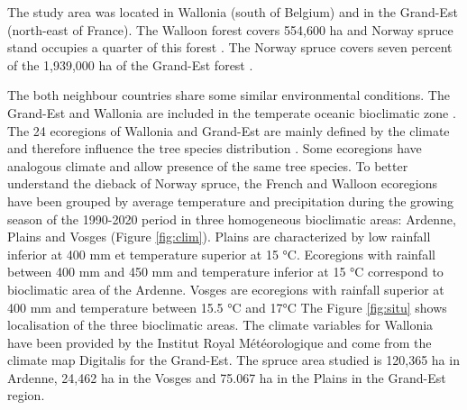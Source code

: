 \documentclass[3p,procedia]{elsarticle}
\begin{document}
The study area was located in Wallonia (south of Belgium) and in the Grand-Est (north-east of France).
The Walloon forest covers 554,600 ha and  Norway spruce stand occupies a quarter of this forest \citep{Alderweireld_2015}. 
The Norway spruce covers seven percent of the 1,939,000 ha of the Grand-Est forest \citep{IGN2022}. 

The both neighbour countries share some similar environmental conditions.
The Grand-Est and Wallonia are included in the temperate oceanic bioclimatic zone \citep{lindner_climate_2010}.
The 24 ecoregions of Wallonia and Grand-Est are mainly defined by the climate and therefore influence the tree species distribution \citep{walthert_tree_2017}.
Some ecoregions have analogous climate and allow presence of the same tree species.
To better understand the dieback of Norway spruce, the French and Walloon ecoregions have been grouped by average temperature and precipitation during the growing season of the 1990-2020 period in three homogeneous bioclimatic areas: Ardenne, Plains and Vosges (Figure \ref{fig:clim}).
Plains are characterized by low rainfall inferior at 400 mm et temperature superior at 15 °C.
Ecoregions with rainfall between 400 mm and 450 mm and temperature inferior at 15 °C correspond to bioclimatic area of the Ardenne.
Vosges are ecoregions with rainfall superior at 400 mm and temperature between 15.5 °C and 17°C
The Figure \ref{fig:situ} shows localisation of the three bioclimatic areas. 
The climate variables for Wallonia have been provided by the Institut Royal Météorologique and come from the climate map Digitalis \citep{piedallu_presentation_2014} for the Grand-Est.
The spruce area studied is 120,365 ha in Ardenne, 24,462 ha in the Vosges and 75.067 ha in the Plains in the Grand-Est region.
\end{document}
